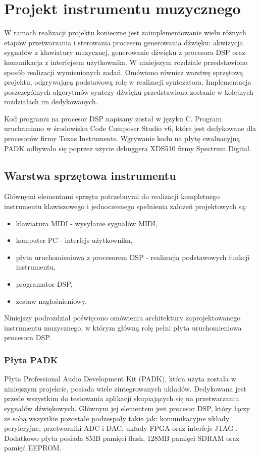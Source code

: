 \chapter{Projekt instrumentu muzycznego}
W ramach realizacji projektu konieczne jest zaimplementowanie wielu różnych etapów przetwarzania i sterowania procesem generowania dźwięku: akwizycja sygnałów z klawiatury muzycznej, generowanie dźwięku z procesora DSP oraz komunikacja z interfejsem użytkownika. W niniejszym rozdziale przedstawiono sposób realizacji wymienionych zadań. Omówiono również warstwę sprzętową projektu, odgrywającą podstawową rolę w realizacji syntezatora. Implementacja poszczególnych algorytmów syntezy dźwięku przedstawiona zostanie w kolejnych rozdziałach im dedykowanych.

Kod programu na procesor DSP napisany został w języku C. Program uruchamiano w środowisku Code Composer Studio v6, które jest dedykowane dla procesorów firmy Texas Instruments. Wgrywanie kodu na płytę ewaluacyjną PADK odbywało się poprzez użycie debuggera XDS510 firmy Spectrum Digital.


\section{Warstwa sprzętowa instrumentu}
Głównymi elementami sprzętu potrzebnymi do realizacji kompletnego instrumentu klawiszowego i jednoczesnego spełnienia założeń projektowych są:
\begin{itemize}
	\item klawiatura MIDI - wysyłanie sygnałów MIDI,
	\item komputer PC - interfejs użytkownika,
	\item płyta uruchomieniowa z procesorem DSP - realizacja podstawowych funkcji instrumentu,
	\item programator DSP,
	\item zestaw nagłośnieniowy.
\end{itemize}

Niniejszy podrozdział poświęcono omówieniu architektury zaprojektowanego instrumentu muzycznego, w którym główną rolę pełni płyta uruchomieniowa procesora DSP.

\subsection{Płyta PADK}
Płyta Professional Audio Development Kit (PADK), która użyta została w niniejszym projekcie, posiada wiele zintegrowanych układów. Dedykowana jest przede wszystkim do testowania aplikacji skupiających się na przetwarzaniu sygnałów dźwiękowych. Głównym jej elementem jest procesor DSP, który łączy ze sobą wszystkie pozostałe podzespoły takie jak: komunikacyjne układy peryferyjne, przetworniki ADC i DAC, układy FPGA oraz interfejs JTAG \cite{dokumentacja_PADK}. Dodatkowo płyta posiada 8MB pamięci flash, 128MB pamięci SDRAM oraz pamięć EEPROM.

